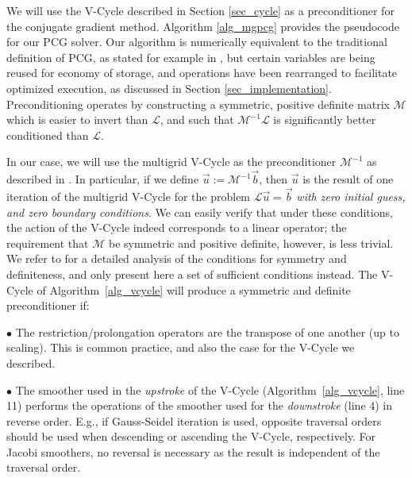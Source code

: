 We will use the V-Cycle described in Section \ref{sec_cycle} as a preconditioner for the conjugate gradient method. Algorithm \ref{alg_mgpcg} provides the pseudocode for our PCG solver. Our
algorithm is numerically equivalent to the traditional definition of PCG, as stated for example in \cite{GolubVanLoan:1989:MC}, but certain variables are being reused for economy of
storage, and operations have been rearranged to facilitate optimized execution, as discussed in Section \ref{sec_implementation}. Preconditioning operates by constructing a symmetric,
positive definite matrix $\mathcal{M}$ which is easier to invert than $\mathcal{L}$, and such that $\mathcal{M}^{-1}\mathcal{L}$ is significantly better conditioned than
$\mathcal{L}$. 


In our case, we will use the multigrid V-Cycle as the preconditioner $\mathcal{M}^{-1}$ as described in \cite{T93}. In particular, if we define $\vec{u}:=\mathcal{M}^{-1}\vec{b}$, then
$\vec{u}$ is the result of one iteration of the multigrid V-Cycle for the problem $\mathcal{L}\vec{u}=\vec{b}$ \emph{with zero initial guess, and zero boundary conditions}. We can easily
verify that under these conditions, the action of the V-Cycle indeed corresponds to a linear operator; the requirement that $\mathcal{M}$ be symmetric and positive definite, however, is
less trivial. We refer to \cite{T93} for a detailed analysis of the conditions for symmetry and definiteness, and only present here a set of sufficient conditions instead. The V-Cycle of
Algorithm~\ref{alg_vcycle} will produce a symmetric and definite preconditioner if:

\noindent$\bullet$ The restriction/prolongation operators are the transpose of one another (up to scaling). This is common practice, and also the case for the V-Cycle we described.

\noindent$\bullet$ The smoother used in the \emph{upstroke} of the V-Cycle (Algorithm~\ref{alg_vcycle}, line 11) performs the operations of the smoother used for the \emph{downstroke} (line 4) in reverse
  order. E.g., if Gauss-Seidel iteration is used, opposite traversal orders should be used when descending or ascending the V-Cycle, respectively. For Jacobi smoothers, no
  reversal is necessary as the result is independent of the traversal order.

